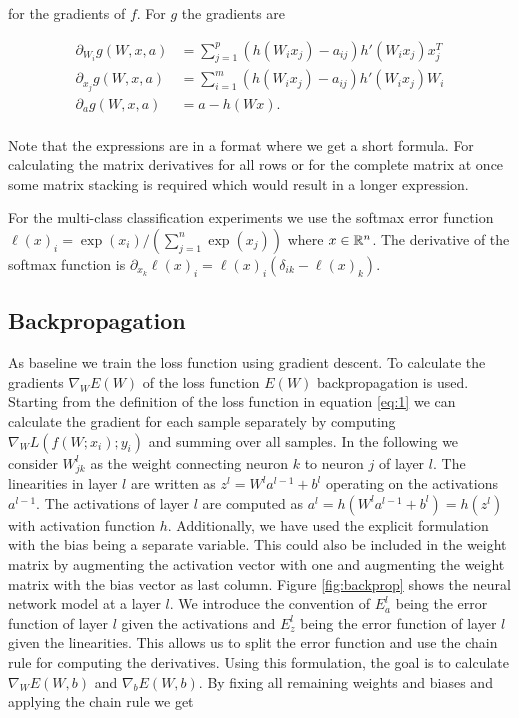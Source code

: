 \documentclass[english,11pt,a4paper]{article}
\begin{document}
for the gradients of $f$. For $g$ the gradients are

\begin{equation}
	\begin{aligned}
		\partial_{W_i} g(W,x,a) &= \sum_{j=1}^{p} (h(W_i x_j) - a_{ij}) h'(W_i x_j) x_j^T \\
		\partial_{x_j} g(W,x,a) &= \sum_{i=1}^{m} (h(W_i x_j) - a_{ij}) h'(W_i x_j) W_i \\		
		\partial_{a} g(W,x,a) &= a - h(Wx). \\
	\end{aligned}
\end{equation}

Note that the expressions are in a format where we get a short formula. For calculating the matrix derivatives for all rows or for the complete matrix at once some matrix stacking is required which would result in a longer expression.

For the multi-class classification experiments we use the softmax error function $\ell(x)_i = \exp(x_i)/(\sum_{j=1}^{n} \exp(x_j))$ where $x \in \mathbb{R}^n$. The derivative of the softmax function is $\partial_{x_k} \ell(x)_i = \ell(x)_i (\delta_{ik} - \ell(x)_k)$.

\subsection{Backpropagation}

As baseline we train the loss function using gradient descent. To calculate the gradients $\nabla_{W}E(W)$ of the loss function $E(W)$ backpropagation is used. Starting from the definition of the loss function in equation \ref{eq:1} we can calculate the gradient for each sample separately by computing $\nabla_{W}L(f(W;x_i);y_i)$ and summing over all samples. In the following we consider $W_{jk}^l$ as the weight connecting neuron $k$ to neuron $j$ of layer $l$. The linearities in layer $l$ are written as $z^l = W^la^{l-1} + b^l$ operating on the activations $a^{l-1}$. The activations of layer $l$ are computed as $a^l = h(W^l a^{l-1} + b^l) = h(z^l)$ with activation function $h$. Additionally, we have used the explicit formulation with the bias being a separate variable. This could also be included in the weight matrix by augmenting the activation vector with one and augmenting the weight matrix with the bias vector as last column. Figure \ref{fig:backprop} shows the neural network model at a layer $l$. We introduce the convention of $E^l_a$ being the error function of layer $l$ given the activations and $E^l_z$ being the error function of layer $l$ given the linearities. This allows us to split the error function and use the chain rule for computing the derivatives. Using this formulation, the goal is to calculate $\nabla_{W}E(W,b)$ and $\nabla_{b}E(W,b)$. By fixing all remaining weights and biases and applying the chain rule we get
\end{document}
